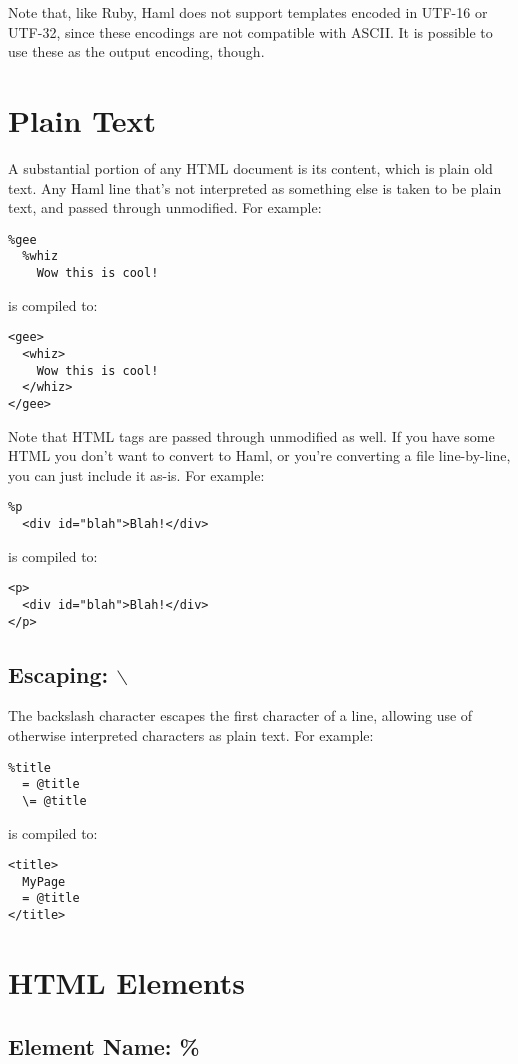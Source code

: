 \documentclass[9pt]{article}
\begin{document}
 Note that, like Ruby, Haml does not support templates encoded in UTF-16 or UTF-32, since these encodings are not compatible with ASCII. It is possible to use these as the output encoding, though.
\section{Plain Text}


 A substantial portion of any HTML document is its content, which is plain old text. Any Haml line that’s not interpreted as something else is taken to be plain text, and passed through unmodified. For example:
\begin{verbatim}
%gee
  %whiz
    Wow this is cool!
\end{verbatim}


 is compiled to:
\begin{verbatim}
<gee>
  <whiz>
    Wow this is cool!
  </whiz>
</gee>
\end{verbatim}


 Note that HTML tags are passed through unmodified as well. If you have some HTML you don’t want to convert to Haml, or you’re converting a file line-by-line, you can just include it as-is. For example:
\begin{verbatim}
%p
  <div id="blah">Blah!</div>
\end{verbatim}


 is compiled to:
\begin{verbatim}
<p>
  <div id="blah">Blah!</div>
</p>
\end{verbatim}
\subsection{Escaping: $\backslash$}


 The backslash character escapes the first character of a line, allowing use of otherwise interpreted characters as plain text. For example:
\begin{verbatim}
%title
  = @title
  \= @title
\end{verbatim}


 is compiled to:
\begin{verbatim}
<title>
  MyPage
  = @title
</title>
\end{verbatim}
\section{HTML Elements}
\subsection{Element Name: \%}
\end{document}
